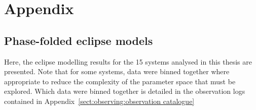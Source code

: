 
\chapter{Appendix}
\label{app:my_appendix}


\onecolumn
\section{Phase-folded eclipse models}
\label{appendix:lightcurves}

Here, the eclipse modelling  results for the 15 systems analysed in this thesis are presented. Note that for some systems, data were binned together where appropriate to reduce the complexity of the parameter space that must be explored. Which data were binned together is detailed in the observation logs contained in Appendix~\ref{sect:observing:observation catalogue}

